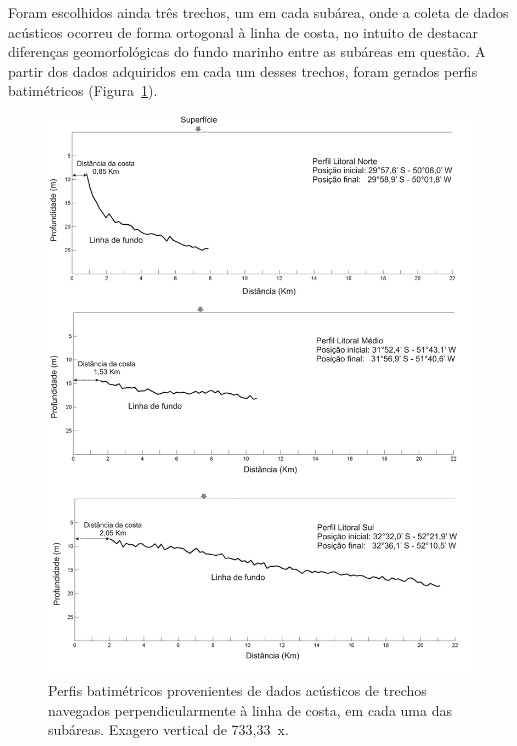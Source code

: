\documentclass[a4paper,11pt,twoside,showtrims,onecolumn,openright,final]{memoir}
\begin{document}
Foram escolhidos ainda três trechos, um em cada subárea, onde a coleta de dados acústicos 
ocorreu de forma ortogonal à linha de costa, no intuito de destacar diferenças geomorfológicas 
do fundo marinho entre as subáreas em questão. A partir dos dados adquiridos em cada um desses 
trechos, foram gerados perfis batimétricos (Figura~\ref{fig:batimetria-fig2}).

%

\begin{figure}
\begin{center}
\includegraphics[width=\textwidth]{BATIMETRIA_PERFIS}
\end{center}
\caption[Perfis batimétricos perpendiculares à linha de costa]
	{Perfis batimétricos provenientes de dados acústicos de trechos 
         navegados perpendicularmente à linha de costa, 
         em cada uma das subáreas. Exagero vertical de 733,33~x.}
\label{fig:batimetria-fig2}
\end{figure}
\end{document}
